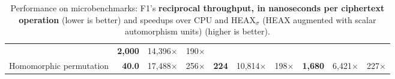 {\begin{table*}[b]
\begin{normalsize}
\begin{center}
\begin{tabular}{l|rrr|rrr|rrr}
        &\textbf{2,000} %
        &14,396$\times$ %
        &190$\times$ %
        \\


        Homomorphic permutation
        &\textbf{40.0} %
        &17,488$\times$ %
        &256$\times$ %

        &\textbf{224} %
        &10,814$\times$ %
        &198$\times$ %

        &\textbf{1,680} %
        &6,421$\times$ %
        &227$\times$ %
        \\
        
        \bottomrule
      \end{tabular}
      \end{center}
      \caption{Performance on microbenchmarks: F1's \textbf{reciprocal throughput, in nanoseconds per ciphertext operation} (lower is better) and speedups over CPU and HEAX$_\sigma$ (HEAX augmented with scalar automorphism units) (higher is better).}
      \label{tbl:microbenchmark}
    \end{normalsize}
  \end{table*}
}


